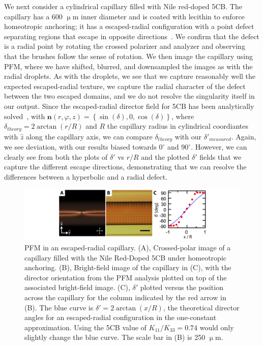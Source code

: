 We next consider a cylindrical capillary filled with Nile red-doped 5CB.\@
The capillary has a 600 $\upmu$m inner diameter and is coated with lecithin to enforce homeotropic anchoring; it has a escaped-radial configuration with a point defect separating regions that escape in opposite directions~\cite{RN179}.
We confirm that the defect is a radial point by rotating the crossed polarizer and analyzer and observing that the brushes follow the sense of rotation.
We then image the capillary using PFM, where we have shifted, blurred, and downsampled the images as with the radial droplets.
As with the droplets, we see that we capture reasonably well the expected escaped-radial texture, we capture the radial character of the defect between the two escaped domains, and we do not resolve the singularity itself in our output.
Since the escaped-radial director field for 5CB has been analytically solved~, with $\mathbf{n}(r,\varphi,z) = \left \{ \sin(\delta), 0, \cos(\delta)   \right \}$, where $\delta_{theory} = 2 \arctan(r/R) $ and $R$ the capillary radius in cylindrical coordiantes with $\hat{z}$ along the capillary axis, we can compare  $\delta_{theory}$ with our $\delta'_{measured}$.
Again, we see deviation, with our results biased towards $0^{\circ}$ and $90^{\circ}$.
However, we can clearly see from both the plots of $\delta'$ vs $r/R$ and the plotted $\delta'$ fields that we capture the different escape directions, demonstrating that we can resolve the differences between a hyperbolic and a radial defect.
\begin{figure}
  \centering
  \includegraphics{figures/C5/Ch5-Figs_PFM_Capillary.png}
  \caption{PFM in an escaped-radial capillary.
  (A), Crossed-polar image of a capillary filled with the Nile Red-Doped 5CB under homeotropic anchoring.
  (B), Bright-field image of the capillary in (C), with the director orientation from the PFM analysis plotted on top of the associated bright-field image.
  (C), $\delta'$ plotted versus the position across the capillary for the column indicated by the red arrow in (B).
  The blue curve is $\delta' = 2 \arctan (x/R)$, the theoretical director angles for an escaped-radial configuration in the one-constant approximation.
  Using the 5CB value of $K_{11}/K_{33} = 0.74$ would only slightly change the blue curve.
  The scale bar in (B) is 250 $\upmu$m.}\label{f:5-PFM_Capillary}
\end{figure}

